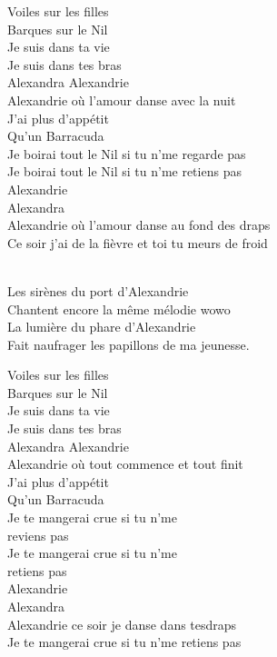 \documentclass{novel}
\begin{document}
\begin{multicols}{2}
Voiles sur les filles \\
Barques sur le Nil \\
Je suis dans ta vie \\
Je suis dans tes bras \\
Alexandra Alexandrie \\

Alexandrie où l'amour danse avec la nuit \\
J'ai plus d'appétit \\
Qu'un Barracuda \\
Je boirai tout le Nil si tu n'me regarde pas \\
Je boirai tout le Nil si tu n’me retiens pas \\
Alexandrie \\
Alexandra \\
Alexandrie où l'amour danse au fond des draps \\
Ce soir j'ai de la fièvre et toi tu meurs de froid \\

\begin{bfseries}
[Refrain:]\\
Les sirènes du port d'Alexandrie \\
Chantent encore la même mélodie wowo \\
La lumière du phare d'Alexandrie \\
Fait naufrager les papillons de ma jeunesse. \\
\end{bfseries}

Voiles sur les filles \\
Barques sur le Nil \\
Je suis dans ta vie \\
Je suis dans tes bras \\
Alexandra Alexandrie \\
Alexandrie où tout commence et tout finit \\
J'ai plus d'appétit \\
Qu'un Barracuda \\
Je te mangerai crue si tu n'me \\
reviens pas \\
Je te mangerai crue si tu n’me \\
retiens pas \\
Alexandrie \\
Alexandra \\

Alexandrie ce soir je danse dans tesdraps \\
Je te mangerai crue si tu n'me retiens pas \\


\end{multicols}
\end{document}
